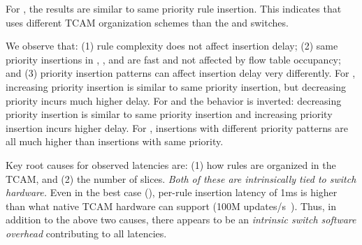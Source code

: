  

For \Intel, the results are similar to same priority rule insertion. This
indicates that \Intel uses different TCAM organization schemes than the
\Broadcom and \IBM switches.  %

 
We observe that: (1) rule complexity does not affect insertion delay; (2)
same priority insertions in \BroadcomOne, \BroadcomThree, \Intel and \IBM are fast
and not affected by flow table occupancy; and (3) priority insertion patterns
can affect insertion delay very differently. For \Intel, increasing priority
insertion is similar to same priority insertion, but decreasing priority 
incurs much higher delay. For \BroadcomThree and \IBM the behavior is inverted:  
decreasing priority insertion is similar to same priority insertion and increasing priority insertion incurs higher delay. For \BroadcomOne, 
insertions with different priority patterns are all much higher than
insertions with same priority. 

Key root causes for observed latencies are: (1) how rules are organized in the TCAM, and (2) the number of slices. {\em Both of these are intrinsically tied to switch hardware.} Even in the best case (\Intel), per-rule insertion latency of 1ms is higher than what native TCAM hardware can support (100M updates/s~\cite{estan:private}). Thus, in addition to the above two causes, there appears to be an {\em intrinsic switch software overhead} contributing to all latencies.

